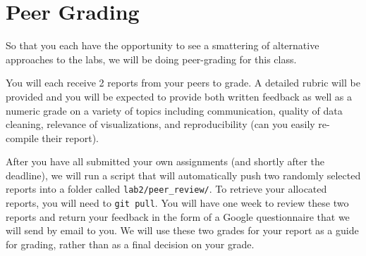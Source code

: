 \documentclass[letterpaper,12pt]{article}
\begin{document}
\section{Peer Grading}

So that you each have the opportunity to see a smattering of alternative approaches to the labs, we will be doing peer-grading for this class.

You will each receive 2 reports from your peers to grade. A detailed rubric will be provided and you will be expected to provide both written feedback as well as a numeric grade on a variety of topics including communication, quality of data cleaning, relevance of visualizations, and reproducibility (can you easily re-compile their report).

After you have all submitted your own assignments (and shortly after the deadline), we will run a script that will automatically push two randomly selected reports into a folder called \texttt{lab2/peer\_review/}. To retrieve your allocated reports, you will need to \texttt{git pull}. You will have one week to review these two reports and return your feedback in the form of a Google questionnaire that we will send by email to you. We will use these two grades for your report as a guide for grading, rather than as a final decision on your grade.
\end{document}
